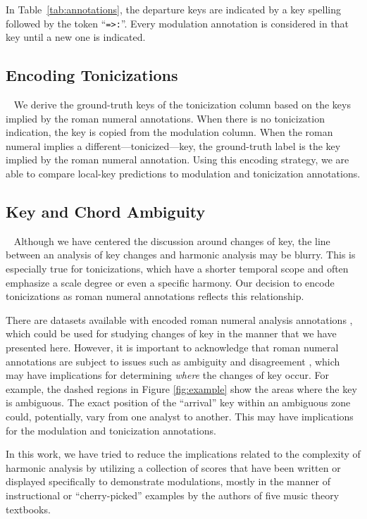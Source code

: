 \documentclass[sigconf]{acmart}
\begin{document}
In Table~\ref{tab:annotations}, the departure keys are indicated by a key spelling followed by the token ``\texttt{=>:}''. 
Every modulation annotation is considered in that key until a new one is indicated.

\subsection{Encoding Tonicizations}~\label{sec:tonicization}
We derive the ground-truth keys of the tonicization column based on the keys implied by the roman numeral annotations.
When there is no tonicization indication, the key is copied from the modulation column.
When the roman numeral implies a different---tonicized---key, the ground-truth label is the key implied by the roman numeral annotation. Using this encoding strategy, we are able to compare local-key predictions to modulation and tonicization annotations. 

\subsection{Key and Chord Ambiguity}~\label{sec:ambiguity}
Although we have centered the discussion around changes of key, the line between an analysis of key changes and harmonic analysis may be blurry. 
This is especially true for tonicizations, which have a shorter temporal scope and often emphasize a scale degree or even a specific harmony. 
Our decision to encode tonicizations as roman numeral annotations reflects this relationship.

There are datasets available with encoded roman numeral analysis annotations \cite{neuwirth_annotated_2018, devaney2015tavern, Tymoczko2019}, which could be used for studying changes of key in the manner that we have presented here. 
However, it is important to acknowledge that roman numeral annotations are subject to issues such as ambiguity and disagreement \cite{condit-schultz2018, koops19, selway2020, arthur2017harmony}, which may have implications for determining \emph{where} the changes of key occur. 
For example, the dashed regions in Figure \ref{fig:example} show the areas where the key is ambiguous. The exact position of the ``arrival'' key within an ambiguous zone could, potentially, vary from one analyst to another. This may have implications for the modulation and tonicization annotations.

In this work, we have tried to reduce the implications related to the complexity of harmonic analysis by utilizing a collection of scores that have been written or displayed specifically to demonstrate modulations, mostly in the manner of instructional or ``cherry-picked'' examples by the authors of five music theory textbooks. 
\end{document}
